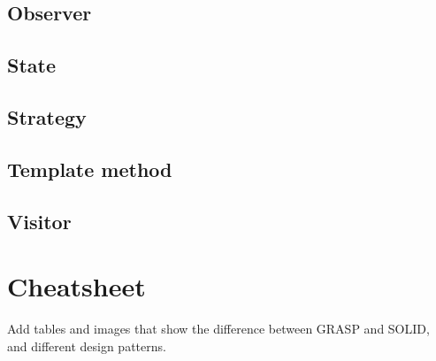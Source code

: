 \documentclass[]{article}
\begin{document}
\subsection{Observer}\label{observer}

\subsection{State}\label{state}

\subsection{Strategy}\label{strategy}

\subsection{Template method}\label{template-method}

\subsection{Visitor}\label{visitor}

\section{Cheatsheet}\label{cheatsheet}

Add tables and images that show the difference between GRASP and SOLID,
and different design patterns.
\end{document}
